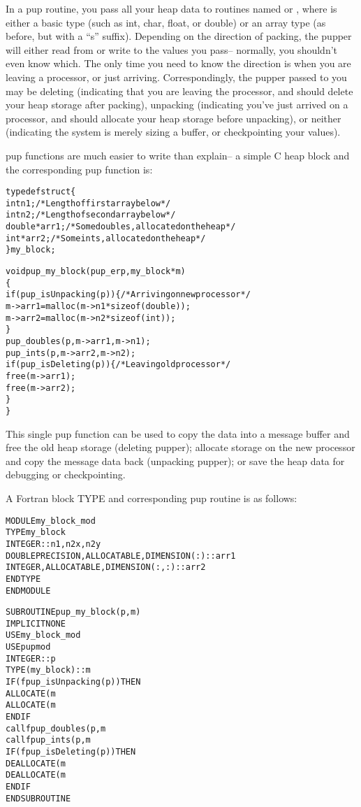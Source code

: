 \documentclass[10pt]{article}
\begin{document}
In a pup routine, you pass all your heap data to routines named  or , where
 is either a basic type (such as int, char, float, or double) or an array
type (as before, but with a ``s'' suffix).  Depending on the direction of
packing, the pupper will either read from or write to the values you pass--
normally, you shouldn't even know which.  The only time you need to know the
direction is when you are leaving a processor, or just arriving.
Correspondingly, the pupper passed to you may be deleting (indicating that you
are leaving the processor, and should delete your heap storage after packing),
unpacking (indicating you've just arrived on a processor, and should allocate
your heap storage before unpacking), or neither (indicating the system is
merely sizing a buffer, or checkpointing your values).

pup functions are much easier to write than explain-- a simple C heap block
and the corresponding pup function is:

\begin{alltt}
     typedef struct \{
       int n1;/*Length of first array below*/
       int n2;/*Length of second array below*/
       double *arr1; /*Some doubles, allocated on the heap*/
       int *arr2; /*Some ints, allocated on the heap*/
     \} my_block;
 
     void pup_my_block(pup_er p,my_block *m)
     \{
       if (pup_isUnpacking(p)) \{ /*Arriving on new processor*/
         m->arr1=malloc(m->n1*sizeof(double));
         m->arr2=malloc(m->n2*sizeof(int));
       \}
       pup_doubles(p,m->arr1,m->n1);
       pup_ints(p,m->arr2,m->n2);
       if (pup_isDeleting(p)) \{ /*Leaving old processor*/
         free(m->arr1);
         free(m->arr2);
       \}
     \}
\end{alltt}

This single pup function can be used to copy the  data into a
message buffer and free the old heap storage (deleting pupper); allocate
storage on the new processor and copy the message data back (unpacking pupper);
or save the heap data for debugging or checkpointing.

A Fortran block TYPE and corresponding pup routine is as follows:

\begin{alltt}
     MODULE my_block_mod
       TYPE my_block
         INTEGER :: n1,n2x,n2y
         DOUBLE PRECISION, ALLOCATABLE, DIMENSION(:) :: arr1
         INTEGER, ALLOCATABLE, DIMENSION(:,:) :: arr2
       END TYPE
     END MODULE
 
     SUBROUTINE pup_my_block(p,m)
       IMPLICIT NONE
       USE my_block_mod
       USE pupmod
       INTEGER :: p
       TYPE(my_block) :: m
       IF (fpup_isUnpacking(p)) THEN
         ALLOCATE(m%arr1(m%n1))
         ALLOCATE(m%arr2(m%n2x,m%n2y))
       END IF
       call fpup_doubles(p,m%arr1,m%n1)
       call fpup_ints(p,m%arr2,m%n2x*m%n2y)
       IF (fpup_isDeleting(p)) THEN
         DEALLOCATE(m%arr1)
         DEALLOCATE(m%arr2)
       END IF
     END SUBROUTINE
\end{alltt}
\end{document}
